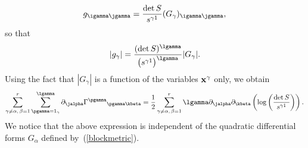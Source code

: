\begin{gather}\label{Painleveblock}
g_{\igamma \jgamma}=\frac{\det S}{s^{\gamma 1}}(G_{\gamma})_{\igamma \jgamma},
\end{gather}
so that
\[
|g_{\gamma}|=\frac{(\det S)^{\lgamma}}{\big({s^{\gamma 1}}\big)^{\lgamma}}|G_{\gamma}|.
\]
Using the fact that $|G_{\gamma}|$ is a function of the variables ${\bf x}^{\gamma}$ only, we obtain
\begin{gather*}%
\sum_{\gamma \neq \alpha, \,\beta=1}^{r}\sum_{\pgamma=1_{\gamma}}^{\lgamma} \partial_{\jalpha}{\Gamma^{\pgamma}}_{\pgamma \kbeta}=\frac{1}{2}\sum_{\gamma \neq \alpha, \,\beta=1}^{r}\lgamma \partial_{\jalpha}\partial_{\kbeta}\left(\log\left(\frac{\det S}{s^{\gamma 1}}\right)\right).
\end{gather*}
We notice that the above expression is independent of the quadratic differential forms $G_{\alpha}$ defined by~(\ref{blockmetric}).

